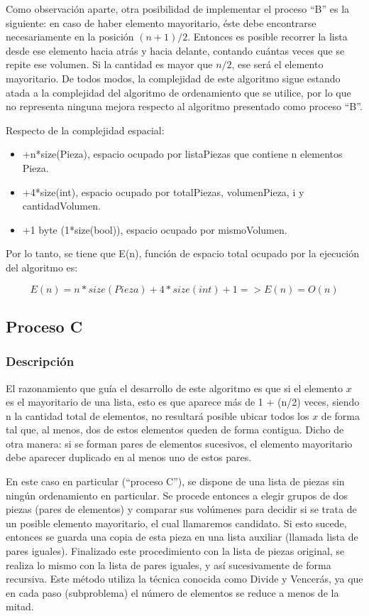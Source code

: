 \documentclass{article}
\begin{document}
Como observación aparte, otra posibilidad de implementar el proceso “B” es la siguiente: en caso de haber elemento mayoritario, éste debe encontrarse necesariamente en la posición \((n+1)/2\).  Entonces es posible recorrer la lista desde ese elemento hacia atrás y hacia delante, contando cuántas veces que se repite ese volumen. 
Si la cantidad es mayor que \(n/2\), ese será el elemento mayoritario. 
De todos modos, la complejidad de este algoritmo sigue estando atada a la complejidad del algoritmo de ordenamiento que se utilice, por lo que no representa ninguna mejora respecto al algoritmo presentado como proceso “B”.


Respecto de la complejidad espacial:

\begin{itemize}
    \item +n*size(Pieza), espacio ocupado por listaPiezas que contiene n elementos Pieza.
    \item +4*size(int), espacio ocupado por totalPiezas, volumenPieza, i y cantidadVolumen.
    \item +1 byte (1*size(bool)), espacio ocupado por mismoVolumen.
\end{itemize}

Por lo tanto, se tiene que E(n), función de espacio total ocupado por la ejecución del algoritmo es:

\begin{equation}
    E(n) = n*size(Pieza) + 4*size(int) + 1 => E(n) = O(n)    
\end{equation}

\newpage
\subsection{Proceso C}
\subsubsection{Descripción}

El razonamiento que guía el desarrollo de este algoritmo es que si el elemento \(x\) es el mayoritario de una lista, esto es que aparece más de 1 + (n/2) veces, siendo n la cantidad total de elementos, no resultará posible ubicar todos los \(x\) de forma tal que, al menos, dos de estos elementos queden de forma contigua. 
Dicho de otra manera: si se forman pares de elementos sucesivos, el elemento mayoritario debe aparecer duplicado en al menos uno de estos pares.

En este caso en particular (“proceso C”), se dispone de una lista de piezas sin ningún ordenamiento en particular. 
Se procede entonces a elegir grupos de dos piezas (pares de elementos) y comparar sus volúmenes para decidir si se trata de un posible elemento mayoritario, el cual llamaremos candidato. 
Si esto sucede, entonces se guarda una copia de esta pieza en una lista auxiliar (llamada lista de pares iguales). 
Finalizado este procedimiento con la lista de piezas original, se realiza lo mismo con la lista de pares iguales, y así sucesivamente de forma recursiva. 
Este  método utiliza la técnica conocida como Divide y Vencerás, ya que en cada paso (subproblema) el número de elementos se reduce a menos de la mitad.
\end{document}
